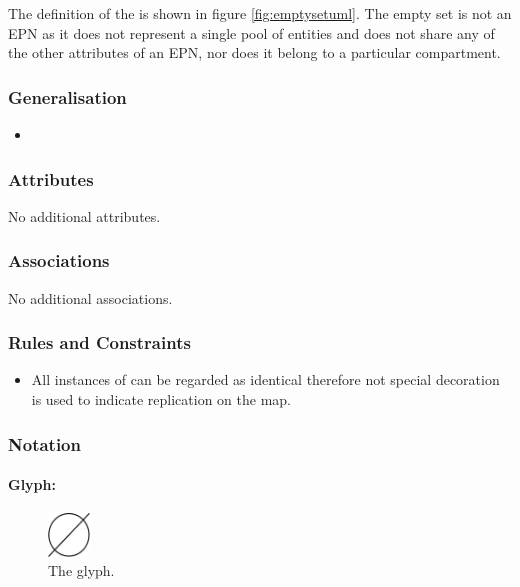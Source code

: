 The definition of the  is shown in figure
\ref{fig:emptysetuml}. The empty set is not an EPN as it does not
represent a single pool of entities and does not share any of the
other attributes of an EPN, nor does it belong to a particular
compartment.

\subsubsection{Generalisation}

\begin{itemize}
\item {}
\end{itemize}

\subsubsection{Attributes}

No additional attributes.

\subsubsection{Associations}

No additional associations.

\subsubsection{Rules and Constraints}

\begin{itemize}
\item  All instances of  can be regarded as identical
therefore not special decoration is used to indicate replication on
the map.
\end{itemize}

\subsubsection{Notation}

\paragraph{Glyph: }

\begin{figure}[H]
  \centering
  \includegraphics[width = 0.1\textwidth]{images/sourceSink}
  \caption{The  glyph.}
  \label{fig:sourceSink}
\end{figure}

